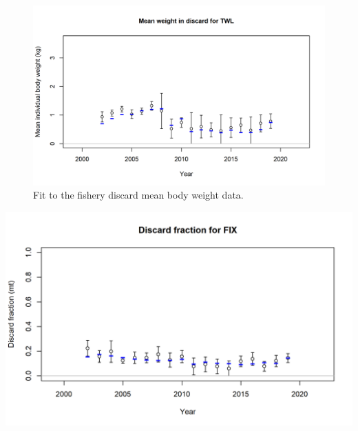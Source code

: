 \documentclass[11pt,
  english,
  a4paper,
]{article}
\begin{document}
\tagmcend\tagstructend


\begin{figure}
\centering
\includegraphics[width=1\textwidth,height=0.75\textheight]{figs/bodywt_fit_fltTWL.png}
\caption{Fit to the fishery discard mean body weight data.\label{fig:bodywtfit}}
\end{figure}

\tagmcend\tagstructend

\clearpage


\includegraphics[width=1\textwidth,height=1\textheight]{figs/discard_fitFIX.png}

\tagmcend\tagstructend

\end{document}
